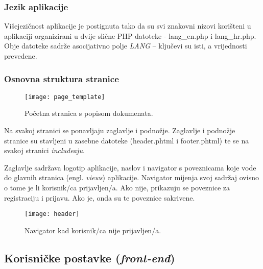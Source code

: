       

      \subsubsection{Jezik aplikacije}

        Višejezičnost aplikacije je postignuta tako da su svi znakovni nizovi
        korišteni u aplikaciji organizirani u dvije slične PHP datoteke -
        lang\_en.php i lang\_hr.php. Obje datoteke sadrže asocijativno polje
        \textit{LANG} -- ključevi su isti, a vrijednosti prevedene.

        

        

    \subsubsection{Osnovna struktura stranice}

    \begin{figure}[h]
      \texttt{[image: page\_template]}
      \caption{Početna stranica s popisom dokumenata.}
    \end{figure}

    Na svakoj stranici se ponavljaju zaglavlje i podnožje. Zaglavlje i podnožje
    stranice su stavljeni u zasebne datoteke (header.phtml i footer.phtml) te se
    na svakoj stranici \textit{includeaju}.

    Zaglavlje sadržava logotip aplikacije, naslov i navigator s poveznicama koje
    vode do glavnih stranica (engl. \textit{views}) aplikacije. Navigator
    mijenja svoj sadržaj ovisno o tome je li korisnik/ca prijavljen/a. Ako nije,
    prikazuju se poveznice za registraciju i prijavu. Ako je, onda su te
    poveznice sakrivene.

    \begin{figure}[h]
      \centering
      \texttt{[image: header]}
      \caption{Navigator kad korisnik/ca nije prijavljen/a.}
    \end{figure}

    \subsection{Korisničke postavke (\textit{front-end})}


